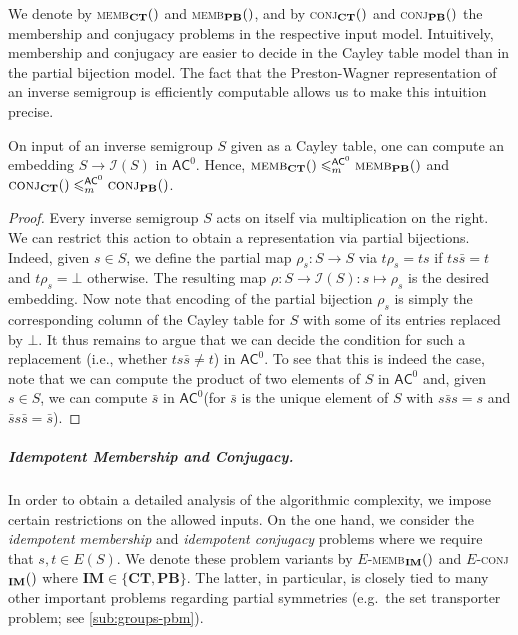 \documentclass[anonymous,letter,UKenglish,cleveref,autoref,thm-restate]{lipics-v2021}
\renewcommand{\leq}{\leqslant}
\newcommand{\eg}{e.g.~}
\newcommand{\ACz}{\ensuremath{\mathsf{AC}^0}\xspace}
\newcommand{\ISym}{\cI}
\newcommand{\cI}{\mathcal{I}}
\theoremstyle{plain}
\theoremstyle{plain}
\newcommand{\dMemb}[2][]{\textup{\textsc{memb${}_{\mathbf{#1}}\expandafter\ifx\expandafter\relax\detokenize{#2}\relax\else(#2)\fi$}}}
\newcommand{\dConj}[2][]{\textup{\textsc{conj${}_{\mathbf{#1}}\expandafter\ifx\expandafter\relax\detokenize{#2}\relax\else(#2)\fi$}}}
\newcommand{\dEMemb}[2][]{\ensuremath{E}\textnormal{-}\dMemb[#1]{#2}}
\newcommand{\dEConj}[2][]{\ensuremath{E}\textnormal{-}\dConj[#1]{#2}}
\newcommand{\mysubparagraph}[1]{\vspace*{-2mm}\subparagraph*{#1}}
\begin{document}
We denote by \dMemb[CT]{} and \dMemb[PB]{}, and by \dConj[CT]{} and \dConj[PB]{} the membership and conjugacy problems in the respective input model.
Intuitively, membership and conjugacy are easier to decide in the Cayley table model than in the partial bijection model. 
The fact that the Preston-Wagner representation \cite{Preston54,Wagner52} of an inverse semigroup is efficiently computable allows us to make this intuition precise.

\begin{lemma}\label{lem:CT_to_PB}
  On input of an inverse semigroup $S$ given as a Cayley table, one can compute an embedding $S \to \ISym(S)$ in \ACz.
  Hence, $\dMemb[CT]{} \leq^{\ACz}_m \dMemb[PB]{}$ and $\dConj[CT]{} \leq^{\ACz}_m \dConj[PB]{}$.
\end{lemma}

\begin{proof}
  Every inverse semigroup $S$ acts on itself via multiplication on the right.
  We can restrict this action to obtain a representation via partial bijections.
  Indeed, given $s \in S$, we define the partial map $\rho_s \colon S \to S$ via $t \rho_s = ts$ if $t s\bar s = t$ and $t \rho_s = \bot$ otherwise.
  The resulting map $\rho \colon S \to \ISym(S) \colon s \mapsto \rho_s$ is the desired embedding.
  Now note that encoding of the partial bijection $\rho_s$ is simply the corresponding column of the Cayley table for $S$ with some of its entries replaced by $\bot$.
  It thus remains to argue that we can decide the condition for such a replacement (i.e., whether $t s\bar s \neq t$) in \ACz.
  To see that this is indeed the case, note that we can compute the product of two elements of $S$ in \ACz and, given $s \in S$, we can compute $\bar s$ in \ACz (for $\bar s$ is the unique element of $S$ with $s\bar ss = s$ and $\bar ss\bar s = \bar s$).
\end{proof}


\mysubparagraph{Idempotent Membership and Conjugacy.}
In order to obtain a detailed analysis of the algorithmic complexity, we impose certain restrictions on the allowed inputs.
On the one hand, we consider the \emph{idempotent membership} and \emph{idempotent conjugacy} problems where we require that $s,t \in E(S)$.
We denote these problem variants by \dEMemb[IM]{} and \dEConj[IM]{} where $\mathbf{IM} \in \{\mathbf{CT}, \mathbf{PB}\}$.
The latter, in particular, is closely tied to many other important problems regarding partial symmetries (\eg the set transporter problem; see \cref{sub:groups-pbm}).
\end{document}
